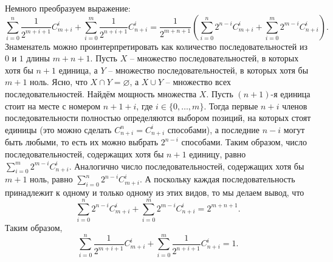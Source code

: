 \documentclass{article}
\begin{document}
Немного преобразуем выражение:
$$\sum_{i=0}^n \frac{1}{2^{m+i+1}} C_{m+i}^i + \sum_{i=0}^m \frac{1}{2^{n+i+1}} C_{n+i}^i = \frac{1}{2^{m+n+1}} \left( \sum_{i=0}^n 2^{n-i} C_{m+i}^i + \sum_{i=0}^m 2^{m-i} C_{n+i}^i \right).$$
Знаменатель можно проинтерпретировать как количество последовательностей из $0$ и $1$ длины $m+n+1$. Пусть $X$ -- множество последовательностей, в которых хотя бы $n+1$
единица, а $Y$ -- множество последовательностей, в которых хотя бы $m+1$ ноль. Ясно, что $X \cap Y = \varnothing$, а $X \cup Y$ -- множество всех последовательностей.
Найдём мощность множества $X$. Пусть $(n + 1)$-я единица стоит на месте с номером $n + 1 +i$, где $i \in \{0, \ldots , m\}$. Тогда первые $n + i$ членов последовательности полностью
определяются выбором позиций, на которых стоят единицы (это можно сделать $C_{n+i}^n=C_{n+i}^i$ способами), а последние $n-i$ могут быть любыми, то есть их можно выбрать $2^{n-i}$ способами.
Таким образом, число последовательностей, содержащих хотя бы $n+1$ единицу, равно $\sum\limits_{i=0}^m 2^{m-i} C_{n+i}^i$.
Аналогично число последовательностей, содержащих хотя бы $m+1$ ноль, равно $\sum\limits_{i=0}^n 2^{n-i} C_{m+i}^i$. А поскольку каждая последовательность принадлежит к одному и только
одному из этих видов, то мы делаем вывод, что
$$\sum_{i=0}^n 2^{n-i} C_{m+i}^i + \sum_{i=0}^m 2^{m-i} C_{n+i}^i = 2^{m+n+1}.$$
Таким образом,
$$\sum_{i=0}^n \frac{1}{2^{m+i+1}} C_{m+i}^i + \sum_{i=0}^m \frac{1}{2^{n+i+1}} C_{n+i}^i = 1.$$
\end{document}
